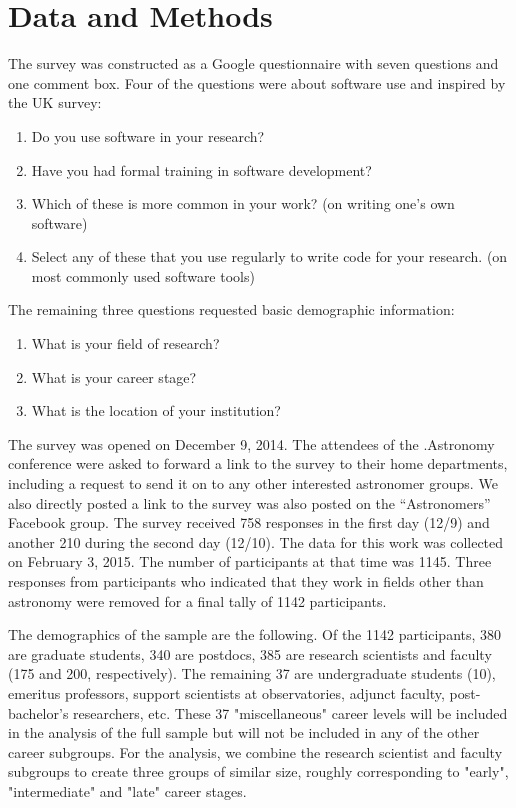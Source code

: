 \section{Data and Methods}
\label{sec:datamethods}

The survey was constructed as a Google questionnaire with seven questions and one comment box. Four of the questions were about software use and inspired by the UK survey:
\begin{enumerate}
\item Do you use software in your research?
\item Have you had formal training in software development?
\item Which of these is more common in your work? (on writing one's own software)
\item Select any of these that you use regularly to write code for your research. (on most commonly used software tools)
\end{enumerate}
The remaining three questions requested basic demographic information:
\begin{enumerate}
\item What is your field of research?
\item What is your career stage?
\item What is the location of your institution?
\end{enumerate}

The survey was opened on December 9, 2014. The attendees of the .Astronomy conference were asked to forward a link to the survey to their home departments, including a request to send it on to any other interested astronomer groups.  We also directly posted a link to the survey was also posted on the ``Astronomers'' Facebook group. The survey received 758 responses in the first day (12/9) and another 210 during the second day (12/10). The data for this work was collected on February 3, 2015. The number of participants at that time was 1145. Three responses from participants who indicated that they work in fields other than astronomy were removed for a final tally of 1142 participants. 

The demographics of the sample are the following. Of the 1142 participants, 380 are graduate students, 340 are postdocs, 385 are research scientists and faculty (175 and 200, respectively). The remaining 37 are undergraduate students (10), emeritus professors, support scientists at observatories, adjunct faculty, post-bachelor's researchers, etc. These 37 "miscellaneous" career levels will be included in the analysis of the full sample but will not be included in any of the other career subgroups. For the analysis, we combine the research scientist and faculty subgroups to create three groups of similar size, roughly corresponding to "early", "intermediate" and "late" career stages.

